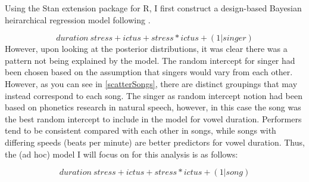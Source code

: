 Using the \citep{goodrichRstanarmBayesianApplied2020} Stan extension package for R, I first construct a design-based Bayesian heirarchical regression model following \cite{heirarchyOne}. 

\begin{equation}
duration ~ stress + ictus + stress*ictus + (1|singer)
\end{equation} 
However, upon looking at the posterior distributions, it was clear there was a pattern not being explained by the model. The random intercept for singer had been chosen based on the assumption that singers would vary from each other. However, as you can see in \ref{scatterSongs}, there are distinct groupings that may instead correspond to each song. The singer as random intercept notion had been based on phonetics research in natural speech, however, in this case the song was the best random intercept to include in the model for vowel duration. Performers tend to be consistent compared with each other in songs, while songs with differing speeds (beats per minute) are better predictors for vowel duration. Thus, the (ad hoc) model I will focus on for this analysis is as follows: 

\begin{equation}
duration ~ stress + ictus + stress*ictus + (1|song)
\end{equation}

